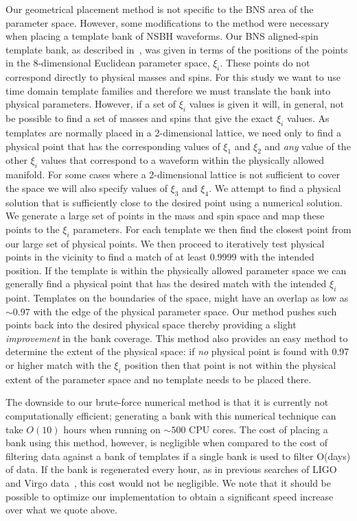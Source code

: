 Our geometrical placement method is not specific to the \ac{BNS} area of the
parameter space. However, some modifications to the method were necessary when
placing a template bank of \ac{NSBH} waveforms. Our \ac{BNS} aligned-spin
template bank, as described in~\cite{Brown:2012qf}, was given in terms of the
positions of the points in the 8-dimensional Euclidean parameter space, $\xi_i$.
These points do not correspond directly to physical masses and spins. For this
study we want to use time domain template families and therefore we
must translate the bank into physical parameters. However, if a set of $\xi_i$ 
values is given it will, in general, not be possible to find a set of masses 
and spins that give the exact $\xi_i$ values. As 
templates are normally placed in a 2-dimensional lattice, we need only to 
find a physical point that has the corresponding values of $\xi_1$ and $\xi_2$ 
and \emph{any} value of the other $\xi_i$ values that correspond to a waveform 
within the physically allowed manifold. For some cases where a 2-dimensional 
lattice is not sufficient to cover the space we will also specify values of 
$\xi_3$ and $\xi_4$. We attempt to find a 
physical solution that is sufficiently close to the desired point using a
numerical solution. We generate a large set of points in
the mass and spin space and map these points to the $\xi_i$ parameters. For 
each template we then find the closest point from our large 
set of physical points.
We then proceed to iteratively test physical points in the vicinity to find a
match of at least 0.9999 with the intended position.
If the template is within the physically allowed parameter space we can 
generally find a physical point that has the desired match with the intended 
$\xi_i$ point.
Templates on the boundaries of the space, might have an
overlap as low as $\sim 0.97$ with the edge of the physical parameter space.
Our method pushes such points back into
the desired physical space thereby providing a slight \emph{improvement} in the
bank coverage. This method also provides an easy method to determine the extent 
of the physical space: if \emph{no} physical point is found with 0.97 or higher 
match with the $\xi_i$ position then that point is not within the physical 
extent of the parameter space and no template needs to be placed there.

The downside to our brute-force numerical method is that it is currently not
computationally efficient; generating a bank with this numerical technique can 
take $O(10)$ hours when running on $\sim 500$
CPU cores. The cost of placing a bank using this method, however, is negligible
when compared to the cost of filtering data against a bank of templates if a 
single bank is used to filter O(days) of data. If the bank is regenerated every 
hour, as in previous searches of LIGO and Virgo data~\cite{Babak:2012zx}, this 
cost would not be negligible.
We note that it should be possible to optimize our implementation to obtain a 
significant speed increase over what we quote above.

